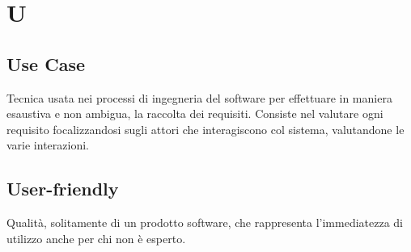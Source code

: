 \section*{U}

\subsection{Use Case}
Tecnica usata nei processi di ingegneria del software per effettuare in maniera esaustiva e non ambigua, la raccolta dei requisiti. Consiste nel valutare ogni requisito focalizzandosi sugli attori che interagiscono col sistema, valutandone le varie interazioni.

\subsection{User-friendly} 
Qualità, solitamente di un prodotto software, che rappresenta l'immediatezza di utilizzo anche per chi non è esperto.
